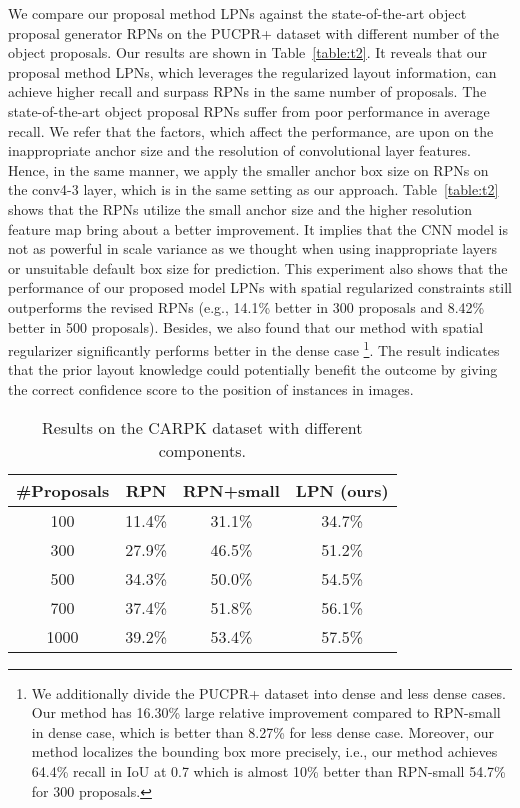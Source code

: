 \documentclass[10pt,twocolumn,letterpaper]{article}
\begin{document}
We compare our proposal method LPNs against the state-of-the-art object proposal generator RPNs \cite{21_ren2015faster} on the PUCPR+ dataset with different number of the object proposals. Our results are shown in Table~\ref{table:t2}. It reveals that our proposal method LPNs, which leverages the regularized layout information, can achieve higher recall and surpass RPNs in the same number of proposals. The state-of-the-art object proposal RPNs suffer from poor performance in average recall. We refer that the factors, which affect the performance, are upon on the inappropriate anchor size and the resolution of convolutional layer features. Hence, in the same manner, we apply the smaller anchor box size on RPNs on the conv4-3 layer, which is in the same setting as our approach. Table~\ref{table:t2} shows that the RPNs utilize the small anchor size and the higher resolution feature map bring about a better improvement. It implies that the CNN model is not as powerful in scale variance as we thought when using inappropriate layers or unsuitable default box size for prediction.
This experiment also shows that the performance of our proposed model LPNs with spatial regularized constraints still outperforms the revised RPNs (e.g., 14.1\% better in 300 proposals and 8.42\% better in 500 proposals).
Besides, we also found that our method with spatial regularizer significantly performs better in the dense case \footnote{We additionally divide the PUCPR+ dataset into dense and less dense cases. Our method has 16.30\% large relative improvement compared to RPN-small in dense case, which is better than 8.27\% for less dense case. Moreover, our method localizes the bounding box more precisely, i.e., our method achieves 64.4\% recall in IoU at 0.7 which is almost 10\% better than RPN-small 54.7\% for 300 proposals.}. The result indicates that the prior layout knowledge could potentially benefit the outcome by giving the correct confidence score to the position of instances in images.


\begin{table}[h]
	\caption{Results on the CARPK dataset with different components.}
\begin{center}
\begin{tabular}{|c|c|c|c|}
\hline
\#Proposals & RPN \cite{21_ren2015faster} & RPN+small & LPN (ours) \\
\hline\hline
100  & 11.4\% & 31.1\% & 34.7\% \\
\hline
300  & 27.9\% & 46.5\% & 51.2\% \\
\hline
500  & 34.3\% & 50.0\% & 54.5\% \\
\hline
700  & 37.4\% & 51.8\% & 56.1\% \\
\hline
1000 & 39.2\% & 53.4\% & 57.5\% \\
\hline
\end{tabular}
\end{center}
\label{table:t3}
\end{table}
\vspace{-0.5 cm}
\end{document}
